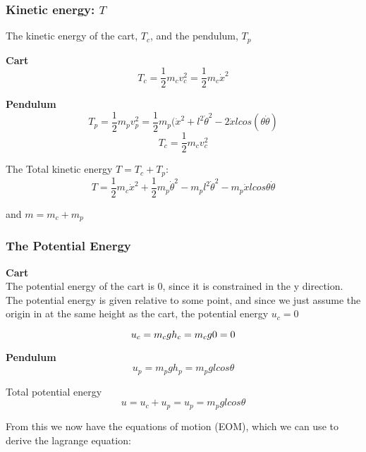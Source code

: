 \documentclass[a4paper]{article}
\begin{document}
\subsubsection{Kinetic energy: $T$}
The kinetic energy of the cart, $T_c$, and the pendulum, $ T_p $

\vspace{5pt}
\textbf{Cart} 
\begin{equation}
T_c = \frac{1}{2}m_c v_c^2 = \frac{1}{2}m_c \dot{x}^2
\end{equation}


\textbf{Pendulum} 
 \begin{equation}
 T_p = \frac{1}{2} m_p v_p^2 = \frac{1}{2} m_p (\dot{x}^2 + l^2 \dot{\theta}^2 - 2\dot{x}l cos(\theta \dot{\theta})
\end{equation}
\begin{equation}
 T_c = \frac{1}{2} m_c v_c^{2} 
\end{equation}


\vspace{5pt}

The Total kinetic energy $ T = T_c + T_p $:
\begin{equation}
	T = \frac{1}{2} m_c \dot{x}^{2} +\frac{1}{2} m_p \dot{\theta}^{2} - m_pl^{2} \dot{\theta }^{2} - m_p \dot{x} l cos \theta \dot{\theta }
\end{equation}

and $ m = m_c + m_p $

\subsubsection{The Potential Energy}

\textbf{Cart} \\
The potential energy of the cart is 0, since it is constrained in the y direction. The potential energy is given relative to some point, and since we just assume the origin in at the same height as the cart, the potential energy $ u_c = 0 $  

\[
 u_c = m_c g h_c = m_c g 0 = 0 \hfill
\] 

\textbf{Pendulum} 
\[
	u_p = m_p g  h_p = m_p g l cos \theta 
\] 

Total potential energy
\begin{equation}
u = u_c + u_p = u_p = m_p g l cos \theta
\end{equation}

From this we now have the equations of motion (EOM), which we can use to derive the lagrange equation:
\end{document}
